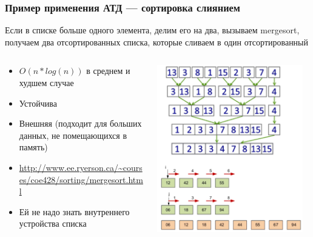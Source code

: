 \documentclass[xetex,mathserif,serif]{beamer}
\begin{document}
	\begin{frame}
		\frametitle{Пример применения АТД --- сортировка слиянием}
		Если в списке больше одного элемента, делим его на два, вызываем mergesort, получаем два отсортированных списка, которые сливаем в один отсортированный
		\begin{columns}
			\begin{column}{0.6\textwidth}
				\begin{itemize}
					\item $O(n * log(n))$ в среднем и худшем случае
					\item Устойчива
					\item Внешняя (подходит для больших данных, не помещающихся в память)
					\item \url{http://www.ee.ryerson.ca/~courses/coe428/sorting/mergesort.html}
					\item Ей не надо знать внутреннего устройства списка
				\end{itemize}
			\end{column}
			\begin{column}{0.4\textwidth}
				\begin{center}
					\includegraphics[width=0.95\textwidth]{mergesort.png}
				\end{center}
			\end{column}
		\end{columns}
	\end{frame}
\end{document}
